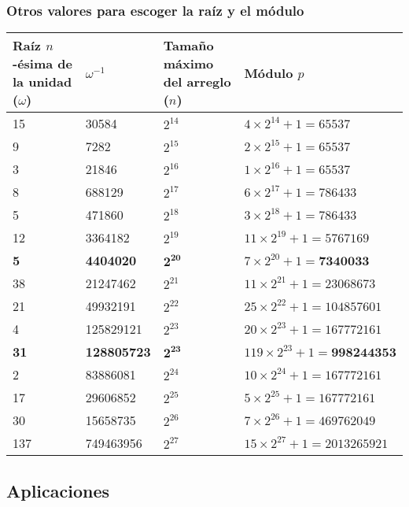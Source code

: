 \documentclass[11pt]{article}
\begin{document}
			\subsubsection{Otros valores para escoger la raíz y el módulo}
				\begin{table}[H]
					\centering
					\begin{tabular}{|p{2cm}|p{1.7cm}|p{2cm}|p{4.5cm}|}
						\hline
						Raíz $n$-ésima de la unidad ($\omega$) & $\omega^{-1}$ & Tamaño máximo del arreglo ($n$) & Módulo $p$ \\ \hline
						15 & 30584 & $2^{14}$ & $4 \times 2^{14} + 1 = 65537$ \\ \hline
						9 & 7282 & $2^{15}$ & $2 \times 2^{15} + 1 = 65537$ \\ \hline
						3 & 21846 & $2^{16}$ & $1 \times 2^{16} + 1 = 65537$ \\ \hline
						8 & 688129 & $2^{17}$ & $6 \times 2^{17} + 1 = 786433$ \\ \hline
						5 & 471860 & $2^{18}$ & $3 \times 2^{18} + 1 = 786433$ \\ \hline
						12 & 3364182 & $2^{19}$ & $11 \times 2^{19} + 1 = 5767169$ \\ \hline
						\textbf{5} & \textbf{4404020} & $\mathbf{2^{20}}$ & $7 \times 2^{20} + 1 = \textbf{7340033}$ \\ \hline
						38 & 21247462 & $2^{21}$ & $11 \times 2^{21} + 1 = 23068673$ \\ \hline
						21 & 49932191 & $2^{22}$ & $25 \times 2^{22} + 1 = 104857601$ \\ \hline
						4 & 125829121 & $2^{23}$ & $20 \times 2^{23} + 1 = 167772161$ \\ \hline
						\textbf{31} & \textbf{128805723} & $\mathbf{2^{23}}$ & $119 \times 2^{23} + 1 = \textbf{998244353}$ \\ \hline
						2 & 83886081 & $2^{24}$ & $10 \times 2^{24} + 1 = 167772161$ \\ \hline
						17 & 29606852 & $2^{25}$ & $5 \times 2^{25} + 1 = 167772161$ \\ \hline
						30 & 15658735 & $2^{26}$ & $7 \times 2^{26} + 1 = 469762049$ \\ \hline
						137 & 749463956 & $2^{27}$ & $15 \times 2^{27} + 1 = 2013265921$ \\ \hline
					\end{tabular}
				\end{table}
		
		
		\subsection{Aplicaciones}
\end{document}
